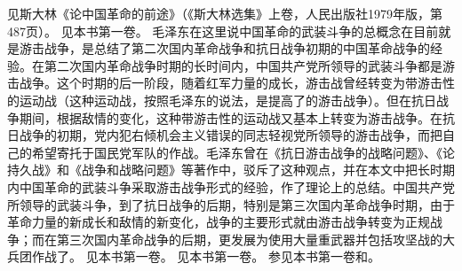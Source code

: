 \begin{maonote}
见斯大林《论中国革命的前途》（《斯大林选集》上卷，人民出版社1979年版，第487页）。
见本书第一卷。
毛泽东在这里说中国革命的武装斗争的总概念在目前就是游击战争，是总结了第二次国内革命战争和抗日战争初期的中国革命战争的经验。在第二次国内革命战争时期的长时间内，中国共产党所领导的武装斗争都是游击战争。这个时期的后一阶段，随着红军力量的成长，游击战曾经转变为带游击性的运动战（这种运动战，按照毛泽东的说法，是提高了的游击战争）。但在抗日战争期间，根据敌情的变化，这种带游击性的运动战又基本上转变为游击战争。在抗日战争的初期，党内犯右倾机会主义错误的同志轻视党所领导的游击战争，而把自己的希望寄托于国民党军队的作战。毛泽东曾在《抗日游击战争的战略问题》、《论持久战》和《战争和战略问题》等著作中，驳斥了这种观点，并在本文中把长时期内中国革命的武装斗争采取游击战争形式的经验，作了理论上的总结。中国共产党所领导的武装斗争，到了抗日战争的后期，特别是第三次国内革命战争时期，由于革命力量的新成长和敌情的新变化，战争的主要形式就由游击战争转变为正规战争；而在第三次国内革命战争的后期，更发展为使用大量重武器并包括攻坚战的大兵团作战了。
见本书第一卷。
见本书第一卷。
参见本书第一卷和。
\end{maonote}

